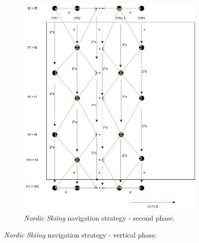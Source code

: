 \begin{figure}[h!]
\begin{subfigure}[t]{0.45\linewidth}
		\includegraphics[width=\linewidth]{graphics/ski_nordique_2.png}
		\caption{\textit{Nordic Skiing} navigation strategy - second phase.}
		\label{fig:ski_nordique_2}
	\end{subfigure}
	\caption{\textit{Nordic Skiing} navigation strategy - vertical phase.}
	\label{fig:ski_nordique}
\end{figure}

